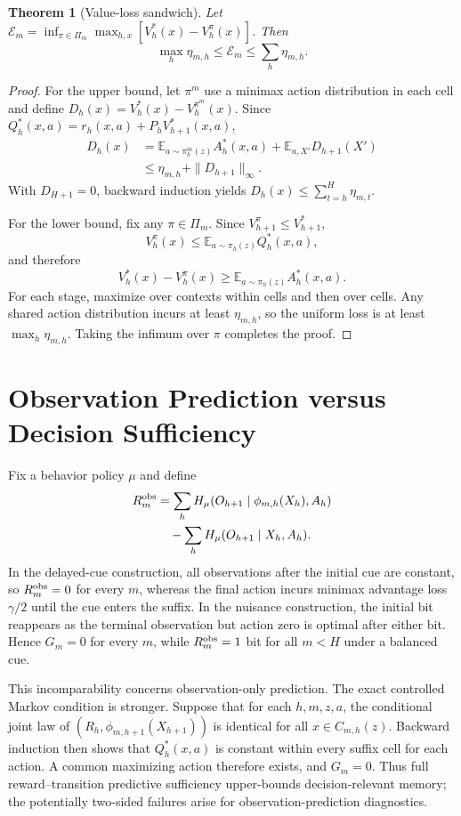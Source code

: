 \documentclass[letterpaper]{article} %
\newtheorem{theorem}{Theorem}
\newcommand{\E}{\mathbb E}
\begin{document}
\begin{theorem}[Value-loss sandwich]
Let
\(\mathcal E_m=\inf_{\pi\in\Pi_m}\max_{h,x}[V_h^*(x)-V_h^\pi(x)]\).  Then
\[
\max_h\eta_{m,h}\leq\mathcal E_m\leq\sum_h\eta_{m,h}.
\]
\end{theorem}
\begin{proof}
For the upper bound, let \(\pi^m\) use a minimax action distribution in each
cell and define \(D_h(x)=V_h^*(x)-V_h^{\pi^m}(x)\).  Since
\(Q_h^*(x,a)=r_h(x,a)+P_hV_{h+1}^*(x,a)\),
\[
\begin{aligned}
D_h(x)
&=\E_{a\sim\pi_h^m(z)}A_h^*(x,a)
 +\E_{a,X'}D_{h+1}(X')\\
&\leq\eta_{m,h}+\|D_{h+1}\|_\infty.
\end{aligned}
\]
With \(D_{H+1}=0\), backward induction yields
\(D_h(x)\leq\sum_{t=h}^H\eta_{m,t}\).

For the lower bound, fix any \(\pi\in\Pi_m\).  Since
\(V_{h+1}^\pi\leq V_{h+1}^*\),
\[
V_h^\pi(x)
\leq\E_{a\sim\pi_h(z)}Q_h^*(x,a),
\]
and therefore
\[
V_h^*(x)-V_h^\pi(x)
\geq\E_{a\sim\pi_h(z)}A_h^*(x,a).
\]
For each stage, maximize over contexts within cells and then over cells.  Any
shared action distribution incurs at least \(\eta_{m,h}\), so the uniform loss
is at least \(\max_h\eta_{m,h}\).  Taking the infimum over \(\pi\) completes
the proof.
\end{proof}

\section{Observation Prediction versus Decision Sufficiency}

Fix a behavior policy \(\mu\) and define
\[
\begin{aligned}
R_m^{\rm obs}
&=\sum_h H_\mu(O_{h+1}\mid\phi_{m,h}(X_h),A_h)\\
&\quad-\sum_h H_\mu(O_{h+1}\mid X_h,A_h).
\end{aligned}
\]
In the delayed-cue construction, all observations after the initial cue are
constant, so \(R_m^{\rm obs}=0\) for every \(m\), whereas the final action
incurs minimax advantage loss \(\gamma/2\) until the cue enters the suffix.
In the nuisance construction, the initial bit reappears as the terminal
observation but action zero is optimal after either bit.  Hence \(G_m=0\) for
every \(m\), while \(R_m^{\rm obs}=1\) bit for all \(m<H\) under a
balanced cue.

This incomparability concerns observation-only prediction.  The exact
controlled Markov condition is stronger.  Suppose that for each \(h,m,z,a\),
the conditional joint law of
\((R_h,\phi_{m,h+1}(X_{h+1}))\) is identical for all
\(x\in C_{m,h}(z)\).  Backward induction then shows that \(Q_h^*(x,a)\) is
constant within every suffix cell for each action.  A common maximizing action
therefore exists, and \(G_m=0\).  Thus full reward--transition predictive
sufficiency upper-bounds decision-relevant memory; the potentially two-sided
failures arise for observation-prediction diagnostics.
\end{document}
